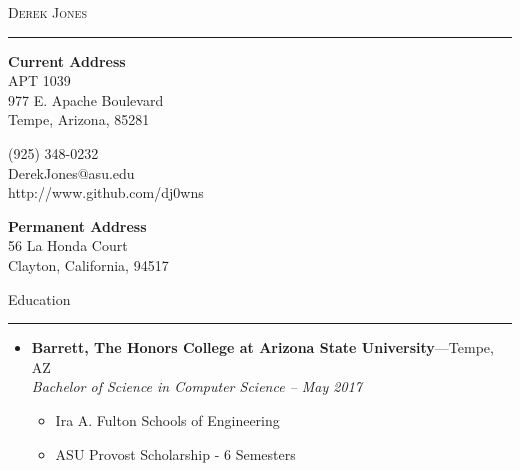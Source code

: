 \documentclass[10pt,oneside]{article}
\makeatletter
\newcommand{\name}{Derek Jones}
\newcommand{\homeaddrtop}{56 La Honda Court}
\newcommand{\homeaddrbot}{Clayton, California, 94517}
\newcommand{\schooladdrtop}{APT 1039}
\newcommand{\schooladdrmid}{977 E. Apache Boulevard}
\newcommand{\schooladdrbot}{Tempe, Arizona, 85281}
\newcommand{\cellphone}{(925) 348-0232}
\newcommand{\email}{DerekJones@asu.edu}
\newcommand{\github}{http://www.github.com/dj0wns}
\newcommand{\bigname}[1]{
	\begin{center}\huge\scshape#1\end{center}
}
\newcommand{\sectitle}[1]{
	\begin{flushleft}{\fontfamily{phv}\selectfont\Large#1}\end{flushleft}
}
\newenvironment{ressection}[1]{
	\vspace{2pt}
	\sectitle{#1}
	\vspace{-10pt}\rule{\textwidth}{0.5pt}
	\vspace{-10pt}
	\begin{itemize}
	\vspace{3pt}
}{
	\end{itemize}
}
\newcommand{\resitem}[1]{
	\vspace{-4pt}
	\item \begin{flushleft} #1 \end{flushleft}
}
\newcommand{\ressubitem}[1]{
	\vspace{-1pt}
	\item \begin{flushleft} #1 \end{flushleft}
}
\newcommand{\resbigitem}[3]{
	\vspace{-5pt}
	\item
	\textbf{#1}---#2 \\
	\textit{#3}
}
\newenvironment{ressubsec}[3]{
	\resbigitem{#1}{#2}{#3}
	\vspace{-2pt}
	\begin{itemize}
}{
	\end{itemize}
}
\makeatother
\begin{document}
 \selectfont

\bigname{\name}
\vspace{-6pt} \rule{\textwidth}{1pt}
\vspace{-22pt}
\begin{multicols}{3}
	
	{\bfseries Current Address}\\
	\schooladdrtop \\
	\schooladdrmid \\
	\schooladdrbot \\
	
	\columnbreak
	\begin{center}
		\cellphone \\
		\email\\
		\github\\
	\end{center}
	
	\columnbreak
	\begin{flushright}
	{\bfseries Permanent Address}\\
	\homeaddrtop\\
	\homeaddrbot\\
	\end{flushright}

\end{multicols}

\vspace{-24 pt}




\vspace{\baselineskip}
\begin{ressection}{Education}
	\begin{ressubsec}{Barrett, The Honors College at Arizona State University}{Tempe, AZ}{Bachelor of Science in Computer Science -- May 2017}
		\ressubitem{Ira A. Fulton Schools of Engineering}
		\ressubitem{ASU Provost Scholarship - 6 Semesters}
	\end{ressubsec}
	

\end{ressection}
\end{document}
